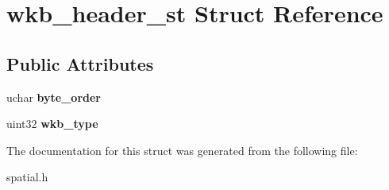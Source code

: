 \hypertarget{structwkb__header__st}{}\section{wkb\+\_\+header\+\_\+st Struct Reference}
\label{structwkb__header__st}
\subsection*{Public Attributes}
\begin{DoxyCompactItemize}
\item 
\mbox{\label{structwkb__header__st_aff13ea0466a9f204cd47a9e434a0bc8b}} 
uchar {\bfseries byte\+\_\+order}
\item 
\mbox{\label{structwkb__header__st_a74420efa3f56ea5aa9ccb8d0f5996753}} 
uint32 {\bfseries wkb\+\_\+type}
\end{DoxyCompactItemize}


The documentation for this struct was generated from the following file\+:\begin{DoxyCompactItemize}
\item 
spatial.\+h\end{DoxyCompactItemize}
